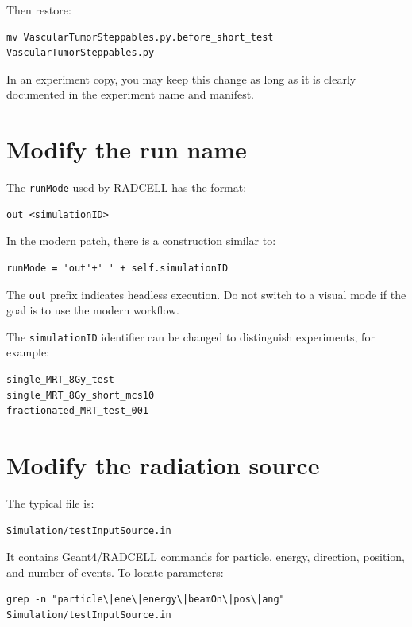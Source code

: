 \documentclass[11pt,a4paper,twoside,pdftex]{refrep}
\begin{document}
Then restore:

\begin{lstlisting}
mv VascularTumorSteppables.py.before_short_test VascularTumorSteppables.py
\end{lstlisting}

In an experiment copy, you may keep this change as long as it is clearly documented in the experiment name and manifest.

\section{Modify the run name}

The \texttt{runMode} used by RADCELL has the format:

\begin{lstlisting}
out <simulationID>
\end{lstlisting}

In the modern patch, there is a construction similar to:

\begin{lstlisting}
runMode = 'out'+' ' + self.simulationID
\end{lstlisting}

The \texttt{out} prefix indicates headless execution. Do not switch to a visual mode if the goal is to use the modern workflow.

The \texttt{simulationID} identifier can be changed to distinguish experiments, for example:

\begin{lstlisting}
single_MRT_8Gy_test
single_MRT_8Gy_short_mcs10
fractionated_MRT_test_001
\end{lstlisting}

\section{Modify the radiation source}

The typical file is:

\begin{lstlisting}
Simulation/testInputSource.in
\end{lstlisting}

It contains Geant4/RADCELL commands for particle, energy, direction, position, and number of events. To locate parameters:

\begin{lstlisting}
grep -n "particle\|ene\|energy\|beamOn\|pos\|ang" Simulation/testInputSource.in
\end{lstlisting}
\end{document}

